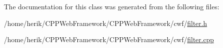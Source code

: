 The documentation for this class was generated from the following files\+:\begin{DoxyCompactItemize}
\item 
/home/herik/\+C\+P\+P\+Web\+Framework/\+C\+P\+P\+Web\+Framework/cwf/\hyperlink{filter_8h}{filter.\+h}\item 
/home/herik/\+C\+P\+P\+Web\+Framework/\+C\+P\+P\+Web\+Framework/cwf/\hyperlink{filter_8cpp}{filter.\+cpp}\end{DoxyCompactItemize}
